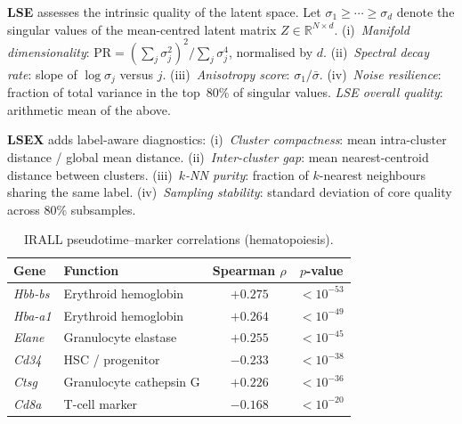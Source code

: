 \documentclass[biology,article,submit,pdftex]{Definitions/mdpi}
\begin{document}
\textbf{LSE} assesses the intrinsic quality of the latent space. Let $\sigma_1 \ge \cdots \ge \sigma_d$ denote the singular values of the mean-centred latent matrix $Z \in \mathbb{R}^{N \times d}$.
(i)~\emph{Manifold dimensionality}: $\mathrm{PR} = (\sum_j \sigma_j^{2})^{2} / \sum_j \sigma_j^{4}$, normalised by $d$.
(ii)~\emph{Spectral decay rate}: slope of $\log \sigma_j$ versus $j$.
(iii)~\emph{Anisotropy score}: $\sigma_1 / \bar{\sigma}$.
(iv)~\emph{Noise resilience}: fraction of total variance in the top~80\% of singular values.
\emph{LSE overall quality}: arithmetic mean of the above.

\textbf{LSEX} adds label-aware diagnostics:
(i)~\emph{Cluster compactness}: mean intra-cluster distance / global mean distance.
(ii)~\emph{Inter-cluster gap}: mean nearest-centroid distance between clusters.
(iii)~\emph{$k$-NN purity}: fraction of $k$-nearest neighbours sharing the same label.
(iv)~\emph{Sampling stability}: standard deviation of core quality across 80\% subsamples.

\begin{table}[!t]
    \centering
    \caption{IRALL pseudotime--marker correlations (hematopoiesis).}
    \label{tab:irall_markers}
    \begin{tabular}{llcc}
        \toprule
        Gene & Function & Spearman $\rho$ & $p$-value \\
        \midrule
        \textit{Hbb-bs} & Erythroid hemoglobin     & $+0.275$ & $< 10^{-53}$ \\
        \textit{Hba-a1} & Erythroid hemoglobin     & $+0.264$ & $< 10^{-49}$ \\
        \textit{Elane}  & Granulocyte elastase     & $+0.255$ & $< 10^{-45}$ \\
        \textit{Cd34}   & HSC / progenitor         & $-0.233$ & $< 10^{-38}$ \\
        \textit{Ctsg}   & Granulocyte cathepsin G  & $+0.226$ & $< 10^{-36}$ \\
        \textit{Cd8a}   & T-cell marker            & $-0.168$ & $< 10^{-20}$ \\
        \bottomrule
    \end{tabular}
\end{table}
\end{document}
